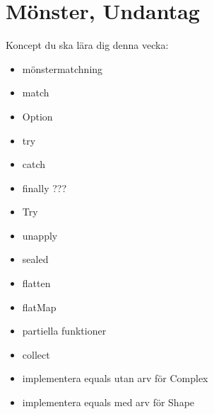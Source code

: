 \chapter{Mönster, Undantag}\label{chapter:W08}
Koncept du ska lära dig denna vecka:
\begin{multicols}{2}\begin{itemize}[nosep,label={$\square$},leftmargin=*]
\item mönstermatchning
\item match
\item Option
\item try
\item catch
\item finally ???
\item Try
\item unapply
\item sealed
\item flatten
\item flatMap
\item partiella funktioner
\item collect
\item implementera equals utan arv för Complex
\item implementera equals med arv för Shape\end{itemize}\end{multicols}
